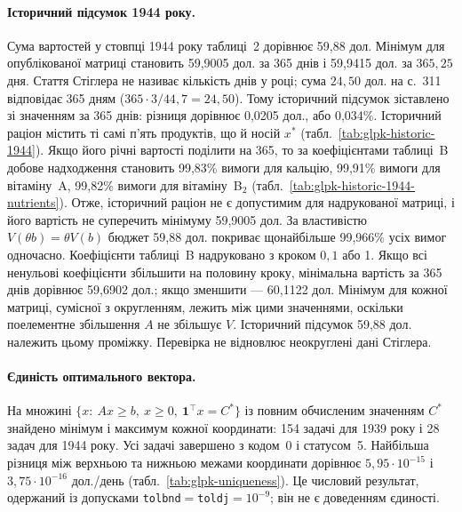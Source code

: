 \paragraph{Історичний підсумок 1944 року.}
Сума вартостей у стовпці 1944 року таблиці~2 дорівнює 59{,}88 дол. Мінімум для опублікованої матриці становить 59{,}9005 дол. за 365 днів і 59{,}9415 дол. за $365{,}25$ дня. Стаття Стіглера не називає кількість днів у році; сума $24{,}50$ дол. на с.~311 відповідає 365 дням ($365\cdot3/44{,}7=24{,}50$). Тому історичний підсумок зіставлено зі значенням за 365 днів: різниця дорівнює 0{,}0205 дол., або 0{,}034\%. Історичний раціон містить ті самі п’ять продуктів, що й носій $x^*$ (табл.~\ref{tab:glpk-historic-1944}). Якщо його річні вартості поділити на 365, то за коефіцієнтами таблиці~B добове надходження становить 99{,}83\% вимоги для кальцію, 99{,}91\% вимоги для вітаміну~A, 99{,}82\% вимоги для вітаміну~B$_2$ (табл.~\ref{tab:glpk-historic-1944-nutrients}). Отже, історичний раціон не є допустимим для надрукованої матриці, і його вартість не суперечить мінімуму 59{,}9005 дол. За властивістю $V(\theta b)=\theta V(b)$ бюджет 59{,}88 дол. покриває щонайбільше 99{,}966\% усіх вимог одночасно. Коефіцієнти таблиці~B надруковано з кроком $0{,}1$ або 1. Якщо всі ненульові коефіцієнти збільшити на половину кроку, мінімальна вартість за 365 днів дорівнює 59{,}6902 дол.; якщо зменшити --- 60{,}1122 дол. Мінімум для кожної матриці, сумісної з округленням, лежить між цими значеннями, оскільки поелементне збільшення $A$ не збільшує $V$. Історичний підсумок 59{,}88 дол. належить цьому проміжку. Перевірка не відновлює неокруглені дані Стіглера.

\paragraph{Єдиність оптимального вектора.}
На множині $\{x:\ Ax\ge b,\ x\ge0,\ \mathbf1^\top x=C^*\}$ із повним обчисленим значенням $C^*$ знайдено мінімум і максимум кожної координати: 154 задачі для 1939 року і 28 задач для 1944 року. Усі задачі завершено з кодом~0 і статусом~5. Найбільша різниця між верхньою та нижньою межами координати дорівнює $5{,}95\cdot10^{-15}$ і $3{,}75\cdot10^{-16}$ дол./день (табл.~\ref{tab:glpk-uniqueness}). Це числовий результат, одержаний із допусками \texttt{tolbnd}$=$\texttt{toldj}$=10^{-9}$; він не є доведенням єдиності.

